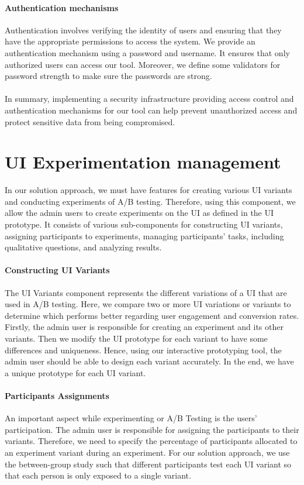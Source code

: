 \paragraph{Authentication mechanisms}
Authentication involves verifying the identity of users and ensuring that they have the appropriate permissions to access the system.
We provide an authentication mechanism using a password and username. 
It ensures that only authorized users can access our tool.
Moreover, we define some validators for password strength to make sure the passwords are strong.\\\\
In summary, implementing a security infrastructure providing access control and authentication mechanisms for our tool can help prevent unauthorized access and protect sensitive data from being compromised.

\clearpage
\section{UI Experimentation management}
\label{sc:section:experimentation}
In our solution approach, we must have features for creating various UI variants and conducting experiments of A/B testing. 
Therefore, using this component, we allow the admin users to create experiments on the UI as defined in the UI prototype.
It consists of various sub-components for constructing UI variants, assigning participants to experiments, managing participants' tasks, including qualitative questions, and analyzing results. 

\paragraph{Constructing UI Variants}
The UI Variants component represents the different variations of a UI that are used in A/B testing. 
Here, we compare two or more UI variations or variants to determine which performs better regarding user engagement and conversion rates. 
Firstly, the admin user is responsible for creating an experiment and its other variants. 
Then we modify the UI prototype for each variant to have some differences and uniqueness. 
Hence, using our interactive prototyping tool, the admin user should be able to design each variant accurately.
In the end, we have a unique prototype for each UI variant.

\paragraph{Participants Assignments}
An important aspect while experimenting or A/B Testing is the users' participation. 
The admin user is responsible for assigning the participants to their variants. 
Therefore, we need to specify the percentage of participants allocated to an experiment variant during an experiment. 
For our solution approach, we use the between-group study such that different participants test each UI variant so that each person is only exposed to a single variant. 

